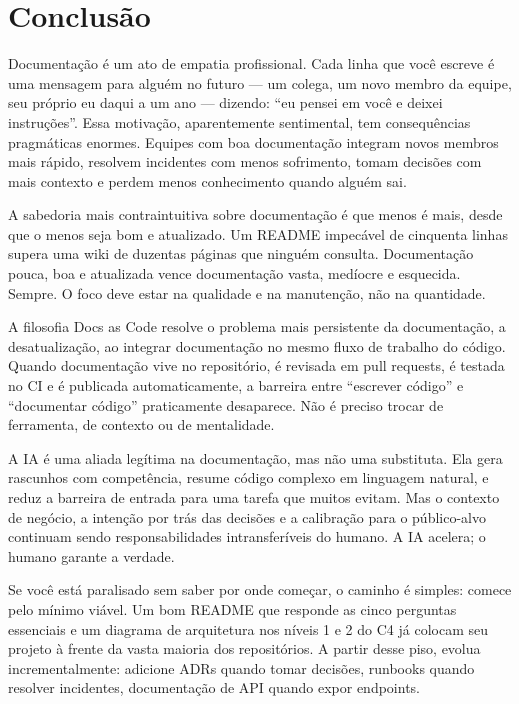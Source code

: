 \section{Conclusão}

Documentação é um ato de empatia profissional. Cada linha que você
escreve é uma mensagem para alguém no futuro --- um colega, um novo
membro da equipe, seu próprio eu daqui a um ano --- dizendo: ``eu
pensei em você e deixei instruções''. Essa motivação, aparentemente
sentimental, tem consequências pragmáticas enormes. Equipes com boa
documentação integram novos membros mais rápido, resolvem incidentes
com menos sofrimento, tomam decisões com mais contexto e perdem menos
conhecimento quando alguém sai.

A sabedoria mais contraintuitiva sobre documentação é que menos é
mais, desde que o menos seja bom e atualizado. Um README impecável
de cinquenta linhas supera uma wiki de duzentas páginas que ninguém
consulta. Documentação pouca, boa e atualizada vence documentação
vasta, medíocre e esquecida. Sempre. O foco deve estar na
qualidade e na manutenção, não na quantidade.

A filosofia Docs as Code resolve o problema mais persistente da
documentação, a desatualização, ao integrar documentação no
mesmo fluxo de trabalho do código. Quando documentação vive no
repositório, é revisada em pull requests, é testada no CI e é
publicada automaticamente, a barreira entre ``escrever código'' e
``documentar código'' praticamente desaparece. Não é preciso trocar
de ferramenta, de contexto ou de mentalidade.

A IA é uma aliada legítima na documentação, mas não uma substituta.
Ela gera rascunhos com competência, resume código complexo em
linguagem natural, e reduz a barreira de entrada para uma tarefa que
muitos evitam. Mas o contexto de negócio, a intenção por trás das
decisões e a calibração para o público-alvo continuam sendo
responsabilidades intransferíveis do humano. A IA acelera; o humano
garante a verdade.

Se você está paralisado sem saber por onde começar, o caminho é
simples: comece pelo mínimo viável. Um bom README que responde as
cinco perguntas essenciais e um diagrama de arquitetura nos níveis 1
e 2 do C4 já colocam seu projeto à frente da vasta maioria dos
repositórios. A partir desse piso, evolua incrementalmente: adicione
ADRs quando tomar decisões, runbooks quando resolver incidentes,
documentação de API quando expor endpoints.

